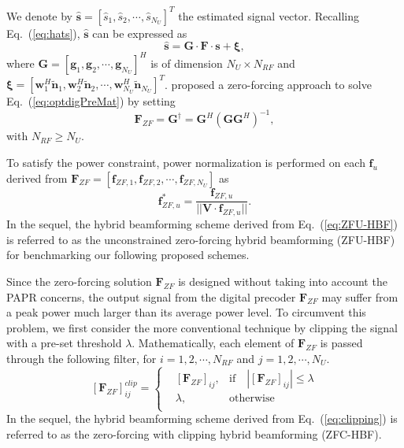 \documentclass[conference]{IEEEtran}
\begin{document}
We denote by $\hat{\bm s}=\left[\hat{s}_1,\hat{s}_2,\cdots,\hat{s}_{N_U}\right]^T$ the estimated signal vector. Recalling Eq.~(\ref{eq:hats}), $\hat{\bm s}$ can be expressed as \cite{alkhateeb2014channel}
\begin{equation}\label{eq:hatsAllUsers}
\hat{\bm s} = {\bm G}\cdot \bm{F} \cdot\bm{s} + \bm{\xi},
\end{equation}
where ${\bm G}=\left[{\bm g}_1,{\bm g}_2,\cdots,{\bm g}_{N_U}\right]^H$ is of dimension $N_U\times N_{RF}$ and ${\bm \xi}=\left[{\bm w}_1^H\tilde{\bm n}_1,{\bm w}_2^H\tilde{\bm n}_2,\cdots,{\bm w}_{N_U}^H\tilde{\bm n}_{N_U}\right]^T$. \cite{alkhateeb2014channel} proposed a zero-forcing approach to solve Eq.~(\ref{eq:optdigPreMat}) by setting
\begin{equation}\label{eq:ZFU-HBF}
\bm{F}_{ZF}={\bm G}^\dagger = \bm{G}^H(\bm{G}\bm{G}^H)^{-1},
\end{equation}
with $N_{RF}\geq N_U$.

To satisfy the power constraint, power normalization is performed on each ${\bm f}_u$ derived from $\bm{F}_{ZF}=\left[\bm{f}_{ZF,1},\bm{f}_{ZF,2},\cdots,\bm{f}_{ZF,N_U}\right]$ as
\begin{equation}\label{eq:ZFU-HBF}
\bm{f}^*_{ZF,u} = {\frac{\bm{f}_{ZF,u}}{||\bm{V}\cdot\bm{f}_{ZF,u}||}}.
\end{equation}
In the sequel, the hybrid beamforming scheme derived from Eq.~(\ref{eq:ZFU-HBF}) is referred to as the unconstrained zero-forcing hybrid beamforming (ZFU-HBF) for benchmarking our following proposed schemes.

Since the zero-forcing solution $\bm{F}_{ZF}$ is designed without taking into account the PAPR concerns, the output signal from the digital precoder $\bm{F}_{ZF}$ may suffer from a peak power much larger than its average power level. To circumvent this problem, we first consider the more conventional technique by clipping the signal with a pre-set threshold $\lambda$. Mathematically, each element of $\bm{F}_{ZF}$ is passed through the following filter, for $i=1,2,\cdots, N_{RF}$ and $j=1,2,\cdots, N_{U}$.
\begin{equation}\label{eq:clipping}
 \left[\bm{F}_{ZF}\right]^{clip}_{ij}=\left\{
\begin{aligned}
& \left[\bm{F}_{ZF}\right]_{ij}, &\mbox{if}\quad |\left[\bm{F}_{ZF}\right]_{ij}|\leq\lambda \\
& \lambda, &\mbox{otherwise}  \\
\end{aligned}
\right.
\end{equation}
 In the sequel, the hybrid beamforming scheme derived from Eq.~(\ref{eq:clipping}) is referred to as the zero-forcing with clipping hybrid beamforming (ZFC-HBF).
\end{document}
